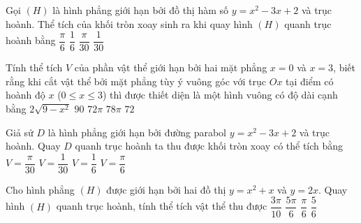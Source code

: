 \begin{ex}%
	Gọi $(H)$ là hình phẳng giới hạn bởi đồ thị hàm số $y=x^2-3x+2$ và trục hoành. Thể tích của khối tròn xoay sinh ra khi quay hình  $(H)$ quanh trục hoành bằng
	\choice 
		{$\dfrac{\pi}{6}$} 
		 {$\dfrac{1}{6}$}
		 {\True $\dfrac{\pi}{30}$}
		{$\dfrac{1}{30}$} 
\end{ex}

\begin{ex}%
	Tính thể tích $V$ của phần vật thể giới hạn  bởi hai mặt phẳng $x=0$ và $x=3$, biết rằng khi cắt vật thể bởi mặt phẳng tùy ý vuông góc với trục $Ox$ tại điểm có hoành độ $x$ ($0\le x\le 3$) thì được thiết diện là một hình vuông có độ dài cạnh bằng $2\sqrt{9-x^2}$
	\choice 
		 {$90$}
		 {$72\pi$}
		 {$78\pi$}
		 {\True $72$}
\end{ex}

\begin{ex}%
	Giả sử $D$ là hình phẳng giới hạn bởi đường parabol $y=x^2-3x+2$ và trục hoành. Quay $D$ quanh trục hoành ta thu được khối tròn xoay có thể tích  bằng
	 \choice
		 {\True $V=\dfrac{\pi}{30}$}
		{$V=\dfrac{1}{30}$} 
		 {$V=\dfrac{1}{6}$}
		{$V=\dfrac{\pi}{6}$} 
\end{ex}

\begin{ex}%
	Cho hình phẳng $(H)$ được giới hạn bởi hai đồ thị $y=x^2+x$ và $y=2x$. Quay hình $(H)$ quanh trục hoành, tính thể tích vật  thể thu được
	 \choice
		 {\True $\dfrac{3\pi}{10}$}
		{$\dfrac{5\pi}{6}$} 
		{$\dfrac{\pi}{6}$} 
		{$\dfrac{5}{6}$} 
\end{ex}

